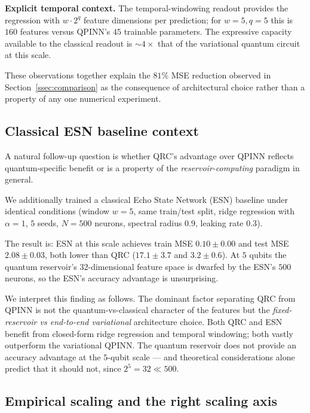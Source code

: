 \documentclass[11pt,a4paper]{article}
\begin{document}
\textbf{Explicit temporal context.} The temporal-windowing readout
provides the regression with $w \cdot 2^q$ feature dimensions per
prediction; for $w=5, q=5$ this is $160$ features versus QPINN's $45$
trainable parameters. The expressive capacity available to the
classical readout is $\sim\!4\times$ that of the variational quantum
circuit at this scale.

These observations together explain the $81\%$ MSE reduction observed
in Section~\ref{ssec:comparison} as the consequence of architectural
choice rather than a property of any one numerical experiment.

\subsection{Classical ESN baseline context}
\label{ssec:esn-context}

A natural follow-up question is whether QRC's advantage over QPINN
reflects quantum-specific benefit or is a property of the
\emph{reservoir-computing} paradigm in general.

We additionally trained a classical Echo State Network (ESN) baseline
under identical conditions (window $w=5$, same train/test split,
ridge regression with $\alpha=1$, $5$ seeds, $N=500$ neurons,
spectral radius $0.9$, leaking rate $0.3$).

The result is: ESN at this scale achieves train MSE $0.10 \pm 0.00$
and test MSE $2.08 \pm 0.03$, both lower than QRC ($17.1 \pm 3.7$ and
$3.2 \pm 0.6$). At $5$ qubits the quantum reservoir's $32$-dimensional
feature space is dwarfed by the ESN's $500$ neurons, so the ESN's
accuracy advantage is unsurprising.

We interpret this finding as follows. The dominant factor separating
QRC from QPINN is not the quantum-vs-classical character of the
features but the \emph{fixed-reservoir vs end-to-end variational}
architecture choice. Both QRC and ESN benefit from closed-form ridge
regression and temporal windowing; both vastly outperform the
variational QPINN. The quantum reservoir does not provide an
accuracy advantage at the $5$-qubit scale --- and theoretical
considerations alone predict that it should not, since
$2^5 = 32 \ll 500$.

\subsection{Empirical scaling and the right scaling axis}
\label{ssec:scaling-crossover}
\end{document}
